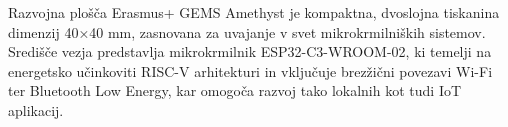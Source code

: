 Razvojna plošča Erasmus+ GEMS Amethyst je kompaktna, dvoslojna tiskanina dimenzij 40×40 mm, zasnovana za uvajanje v svet mikrokrmilniških sistemov. Središče vezja predstavlja mikrokrmilnik ESP32-C3-WROOM-02, ki temelji na energetsko učinkoviti RISC-V arhitekturi in vključuje brezžični povezavi Wi-Fi ter Bluetooth Low Energy, kar omogoča razvoj tako lokalnih kot tudi IoT aplikacij.